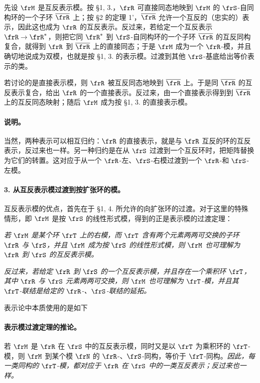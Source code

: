 先设 \(\frM\) 是互反表示模。按 §1, 3.，\(\frR\) 可直接同态地映到 \(\frM\) 的 \(\frS\)-自同构环的一个子环 \(\overline{\frR}\) 上；按 §2 的定理 1'，\(\overline{\frR}\) 允许一个互反的（忠实的）表示，因此这也成为 \(\frR\) 的互反表示。反过来，若给定一个互反表示 \(\frR\to\frR^*\)，则把它同 \(\frR^*\) 到 \(\frS\)-自同构环的一个子环 \(\overline{\frR}\) 的互反同构复合，就得到 \(\frR\) 到 \(\overline{\frR}\) 上的直接同态；于是 \(\frM\) 成为一个 \(\frR\)-模，并且确切地说成为双模，也就是按 §1, 3. 的表示模。过渡到其他 \(\frS\)-基底给出等价表示的类。

若讨论的是直接表示模，则 \(\frR\) 被互反同态地映到 \(\overline{\frR}\) 上。于是同 \(\overline{\frR}\) 的互反表示复合，给出 \(\frR\) 的一个直接表示。反过来，由一个直接表示得到到 \(\overline{\frR}\) 上的互反同态映射；随后 \(\frM\) 成为按 §1, 3. 的直接表示模。

\paragraph{说明。}
当然，两种表示可以相互归约：\(\frR\) 的直接表示，就是与 \(\frR\) 互反的环的互反表示，反过来也一样。另一种归约是在从 \(\frS\) 过渡到一个互反环时，把矩阵替换为它们的转置。这对应于从一个 \(\frR\)-左、\(\frS\)-右模过渡到一个 \(\frR\)-和 \(\frS\)-左模。

\paragraph{3. 从互反表示模过渡到按扩张环的模。}
互反表示模的优点，首先在于 §1, 4. 所允许的向扩张环的过渡。对于这里的特殊情形，即 \(\frM\) 是按 \(\frS\) 的线性形式模，得到的正是表示模的过渡定理：

\emph{若 \(\frM\) 是某个环 \(\frT\) 上的右模，而 \(\frT\) 含有两个元素两两可交换的子环 \(\frR\) 与 \(\frS\)，并且 \(\frM\) 成为按 \(\frS\) 的线性形式模，则 \(\frM\) 也可理解为 \(\frR\) 到 \(\frS\) 的互反表示模。}

\emph{反过来，若给定 \(\frR\) 到 \(\frS\) 的一个互反表示模，并且存在一个乘积环 \(\frT\)，其中 \(\frR\) 与 \(\frS\) 元素两两可交换，则 \(\frM\) 也可理解为 \(\frT\)-模，并且其 \(\frT\)-联结是给定的 \(\frR\)-、\(\frS\)-联结的延拓。}

表示论中本质使用的是如下

\paragraph{表示模过渡定理的推论。}
若 \(\frM\) 是 \(\frR\) 在 \(\frS\) 中的互反表示模，同时又是以 \(\frT\) 为乘积环的 \(\frT\)-模，则 \(\frM\) 到某个模 \(\frN\) 的 \(\frR\)-、\(\frS\)-同构，等价于 \(\frT\)-同构。\emph{因此，每一类同构的 \(\frT\)-模，都对应于 \(\frR\) 在 \(\frS\) 中的一类互反表示；反过来也一样。}

